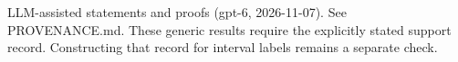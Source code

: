 \documentclass[11pt]{article}
\begin{document}

\bigskip
{\footnotesize LLM-assisted statements and proofs (gpt-6, 2026-11-07).
See PROVENANCE.md. These generic results require the explicitly stated support
record. Constructing that record for interval labels remains a separate check.}
\end{document}
